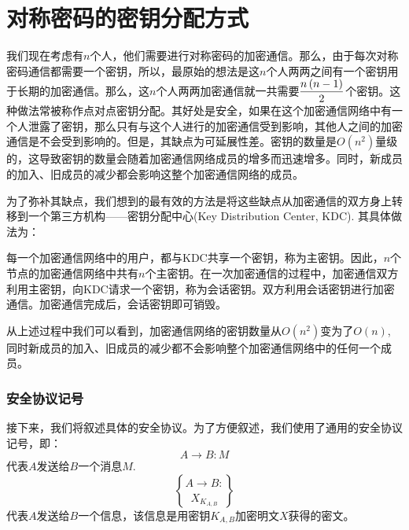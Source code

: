 \section{对称密码的密钥分配方式}
我们现在考虑有$n$个人，他们需要进行对称密码的加密通信。那么，由于每次对称密码通信都需要一个密钥，所以，最原始的想法是这$n$个人两两之间有一个密钥用于长期的加密通信。那么，这$n$个人两两加密通信就一共需要$\displaystyle\frac{n\left( {n-1}\right)}{2}$个密钥。这种做法常被称作点对点密钥分配。其好处是安全，如果在这个加密通信网络中有一个人泄露了密钥，那么只有与这个人进行的加密通信受到影响，其他人之间的加密通信是不会受到影响的。但是，其缺点为可延展性差。密钥的数量是$O(n^2)$量级的，这导致密钥的数量会随着加密通信网络成员的增多而迅速增多。同时，新成员的加入、旧成员的减少都会影响这整个加密通信网络的成员。\par
为了弥补其缺点，我们想到的最有效的方法是将这些缺点从加密通信的双方身上转移到一个第三方机构——密钥分配中心(Key Distribution Center, KDC). 其具体做法为：\par
每一个加密通信网络中的用户，都与KDC共享一个密钥，称为主密钥。因此，$n$个节点的加密通信网络中共有$n$个主密钥。在一次加密通信的过程中，加密通信双方利用主密钥，向KDC请求一个密钥，称为会话密钥。双方利用会话密钥进行加密通信。加密通信完成后，会话密钥即可销毁。\par
从上述过程中我们可以看到，加密通信网络的密钥数量从$O(n^2)$变为了$O(n)$, 同时新成员的加入、旧成员的减少都不会影响整个加密通信网络中的任何一个成员。
\subsubsection{安全协议记号}
接下来，我们将叙述具体的安全协议。为了方便叙述，我们使用了通用的安全协议记号，即：
\[A\to B: M\]
代表$A$发送给$B$一个消息$M$.
\[A\to B: \brace{X}_{K_{A, B}}\]
代表$A$发送给$B$一个信息，该信息是用密钥$K_{A, B}$加密明文$X$获得的密文。
